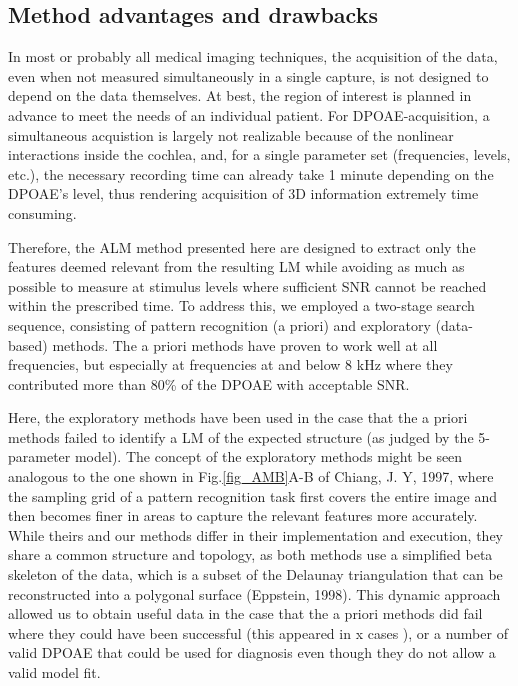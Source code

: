 \documentclass[journal,twoside,web]{ieeecolor2}
\begin{document}
\subsection{Method advantages and drawbacks}
In most or probably all medical imaging techniques, the acquisition of the data, even when not measured simultaneously in a single capture, is not designed to depend on the data themselves.
At best, the region of interest is planned in advance to meet the needs of an individual patient.
For DPOAE-acquisition, a simultaneous acquistion is largely not realizable because of the nonlinear interactions inside the cochlea, and, for a single parameter set (frequencies, levels, etc.), the necessary recording time can already take 1 minute depending on the DPOAE's level, thus rendering acquisition of 3D information extremely time consuming.

Therefore, the ALM method presented here are designed to extract only the features deemed relevant from the resulting LM while avoiding as much as possible to measure at stimulus levels where sufficient SNR cannot be reached within the prescribed time.
To address this, we employed a two-stage search sequence, consisting of pattern recognition (a priori) and exploratory (data-based) methods.
The a priori methods have proven to work well at all frequencies, but especially at frequencies at and below 8 kHz where they contributed more than 80\% of the DPOAE with acceptable SNR.

Here, the exploratory methods have been used in the case that the a priori methods failed to identify a LM of the expected structure (as judged by the 5-parameter model).
 The concept of the exploratory methods might be seen analogous to the one shown in Fig.\ref{fig_AMB}A-B of  Chiang, J. Y, 1997, where the sampling grid of a pattern recognition task first covers the entire image and then becomes finer in areas to capture the relevant features more accurately.
While theirs and our methods differ in their implementation and execution, they share a common structure and topology, as both methods use a simplified beta skeleton of the data, which is a subset of the Delaunay triangulation that can be reconstructed into a polygonal surface (Eppstein, 1998).
This dynamic approach allowed us to obtain useful data in the case that the a priori methods did fail where they could have been successful (this appeared in x cases ), or a number of valid DPOAE that could be used for diagnosis even though they do not allow a valid model fit.
\end{document}
